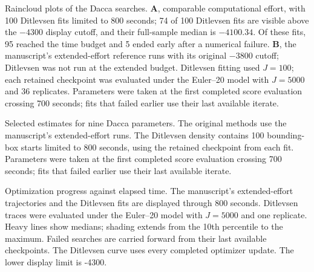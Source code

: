 
\caption{Raincloud plots of the Dacca searches. \textbf{A}, comparable
computational effort, with 100 Ditlevsen fits limited to 800 seconds;
74 of 100 Ditlevsen fits are visible above the
$-4300$ display cutoff, and their full-sample median is
$-4100.34$. Of these fits, 95 reached the time budget and
5 ended early after a numerical failure. \textbf{B}, the
manuscript's extended-effort reference runs with its original
$-3800$ cutoff; Ditlevsen was not run at the
extended budget. Ditlevsen fitting used $J=100$; each retained
checkpoint was evaluated under the Euler--20 model with $J=5000$
and 36 replicates. Parameters were taken at the first completed score evaluation crossing 700 seconds; fits that failed earlier use their last available iterate.}

\caption{Selected estimates for nine Dacca parameters. The original methods
use the manuscript's extended-effort runs. The Ditlevsen density contains
100 bounding-box starts limited to 800 seconds, using the retained
checkpoint from each fit. Parameters were taken at the first completed score evaluation crossing 700 seconds; fits that failed earlier use their last available iterate.}

\caption{Optimization progress against elapsed time. The manuscript's
extended-effort trajectories and the Ditlevsen fits are displayed through
800 seconds. Ditlevsen traces were evaluated under the Euler--20 model
with $J=5000$ and one replicate. Heavy lines show medians;
shading extends from the 10th percentile to the maximum. Failed searches are
carried forward from their last available checkpoints. The Ditlevsen curve uses every completed optimizer update. The lower display limit
is -4300.}

